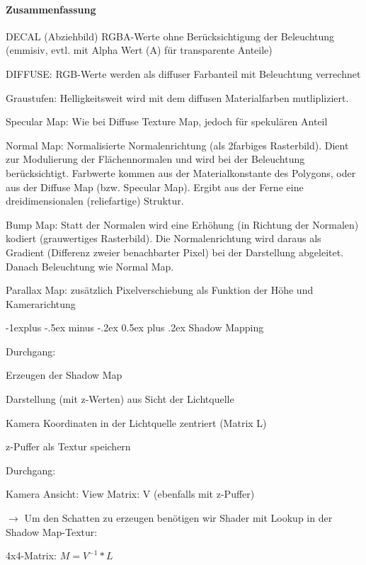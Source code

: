 \documentclass[landscape]{article}
\makeatletter
\renewcommand{\subsection}{\@startsection{subsection}{2}{0mm}%
                                {-1explus -.5ex minus -.2ex}%
                                {0.5ex plus .2ex}%
                                {\normalfont\normalsize\bfseries}}
\makeatother
\begin{document}
\begin{multicols}{3}
  \paragraph{Zusammenfassung}
  \begin{itemize*}
    \item DECAL (Abziehbild) RGBA-Werte ohne Berücksichtigung der Beleuchtung (emmisiv, evtl. mit Alpha Wert (A) für transparente Anteile)
    \item DIFFUSE: RGB-Werte werden als diffuser Farbanteil mit Beleuchtung verrechnet
    \item Graustufen: Helligkeitsweit wird mit dem diffusen Materialfarben mutlipliziert.
    \item Specular Map: Wie bei Diffuse Texture Map, jedoch für spekulären Anteil
    \item Normal Map: Normalisierte Normalenrichtung (als 2farbiges Rasterbild). Dient zur Modulierung der Flächennormalen und wird bei der Beleuchtung berücksichtigt. Farbwerte kommen aus der Materialkonstante des Polygons, oder aus der Diffuse Map (bzw. Specular Map). Ergibt aus der Ferne eine dreidimensionalen (reliefartige) Struktur.
    \item Bump Map: Statt der Normalen wird eine Erhöhung (in Richtung der Normalen) kodiert (grauwertiges Rasterbild). Die Normalenrichtung wird daraus als Gradient (Differenz zweier benachbarter Pixel) bei der Darstellung abgeleitet. Danach Beleuchtung wie Normal Map.
    \item Parallax Map: zusätzlich Pixelverschiebung als Funktion der Höhe und Kamerarichtung
  \end{itemize*}
  
  \subsection{ Shadow Mapping}
  \begin{enumerate*}
    \item Durchgang:
          \begin{itemize*} 
            \item Erzeugen der Shadow Map
            \item Darstellung (mit z-Werten) aus Sicht der Lichtquelle
            \item Kamera Koordinaten in der Lichtquelle zentriert (Matrix L)
            \item z-Puffer als Textur speichern
          \end{itemize*}
    \item Durchgang:
          \begin{itemize*}
            \item Kamera Ansicht: View Matrix: V (ebenfalls mit z-Puffer)
            \item $\rightarrow$ Um den Schatten zu erzeugen benötigen wir Shader mit Lookup in der Shadow Map-Textur:
            \item 4x4-Matrix: $M = V^{-1}*L$
          \end{itemize*}
  \end{enumerate*}
  

\end{multicols}
\end{document}

